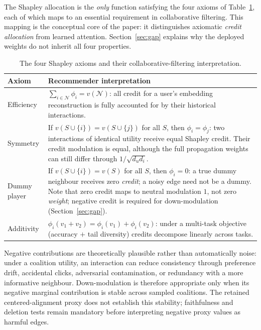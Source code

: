 \documentclass[a4paper,fleqn,longmktitle]{cas-dc}
\begin{document}
The Shapley allocation is the \emph{only} function satisfying the four axioms
of Table~\ref{tab:axioms}, each of which maps to an essential requirement in
collaborative filtering. This mapping is the conceptual core of the paper: it distinguishes axiomatic \emph{credit allocation} from learned attention.
Section~\ref{sec:gap} explains why the deployed weights do not inherit all
four properties.

\begin{table}[t]
\centering
\caption{The four Shapley axioms and their collaborative-filtering
interpretation.}
\label{tab:axioms}
\footnotesize
\begin{tabular}{p{1.15cm}p{6.1cm}}
\toprule
\textbf{Axiom} & \textbf{Recommender interpretation} \\
\midrule
Efficiency & $\sum_{i \in \mathcal{N}} \phi_i = v(\mathcal{N})$: all credit
for a user's embedding reconstruction is fully accounted for by their
historical interactions. \\
Symmetry & If $v(S \cup \{i\}) = v(S \cup \{j\})$ for all $S$, then $\phi_i =
\phi_j$: two interactions of identical utility receive equal Shapley credit. Their
credit modulation is equal, although the full propagation weights can still
differ through $1/\sqrt{d_ud_i}$. \\
Dummy player & If $v(S \cup \{i\}) = v(S)$ for all $S$, then $\phi_i = 0$:
a true dummy neighbour receives zero \emph{credit}; a noisy edge need not be a
dummy. Note
that zero credit maps to neutral modulation $1$, not zero \emph{weight};
negative credit is required for down-modulation
(Section~\ref{sec:gap}). \\
Additivity & $\phi_i(v_1 + v_2) = \phi_i(v_1) + \phi_i(v_2)$: under a
multi-task objective (accuracy $+$ tail diversity) credits decompose linearly
across tasks. \\
\bottomrule
\end{tabular}
\end{table}

Negative contributions are theoretically plausible rather than automatically
noise: under a coalition utility, an interaction can reduce consistency through
preference drift, accidental clicks, adversarial contamination, or redundancy
with a more informative neighbour. Down-modulation is therefore appropriate
only when its negative marginal contribution is stable across sampled
coalitions. The retained centered-alignment proxy does not establish this
stability; faithfulness and deletion tests remain mandatory before interpreting
negative proxy values as harmful edges.
\end{document}

